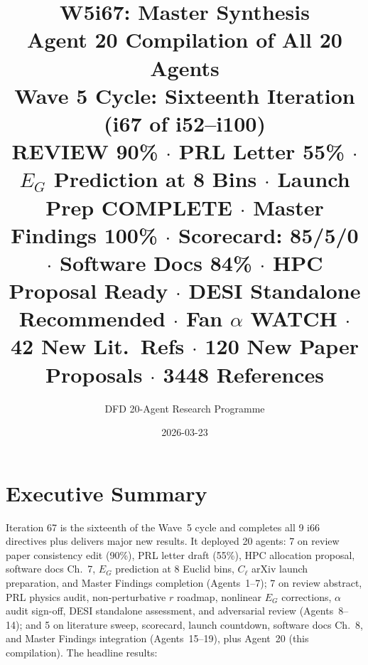 \documentclass[11pt,a4paper]{article}
\title{\Huge W5i67: Master Synthesis\\[12pt]
\Large Agent 20 Compilation of All 20 Agents\\[6pt]
\large Wave 5 Cycle: Sixteenth Iteration (i67 of i52--i100)\\[6pt]
\normalsize \textbf{REVIEW 90\%} $\cdot$ PRL Letter 55\% $\cdot$ $E_G$ Prediction at 8 Bins $\cdot$ Launch Prep COMPLETE $\cdot$ Master Findings 100\% $\cdot$ Scorecard: 85/5/0 $\cdot$ Software Docs 84\% $\cdot$ HPC Proposal Ready $\cdot$ DESI Standalone Recommended $\cdot$ Fan $\alpha$ WATCH $\cdot$ 42 New Lit.\ Refs $\cdot$ 120 New Paper Proposals $\cdot$ 3448 References}
\author{DFD 20-Agent Research Programme}
\date{2026-03-23}
\begin{document}
\maketitle


\section{Executive Summary}

Iteration 67 is the sixteenth of the Wave~5 cycle and completes all 9 i66 directives plus delivers major new results. It deployed 20 agents: 7 on review paper consistency edit (90\%), PRL letter draft (55\%), HPC allocation proposal, software docs Ch.~7, $E_G$ prediction at 8 Euclid bins, $C_\ell$ arXiv launch preparation, and Master Findings completion (Agents~1--7); 7 on review abstract, PRL physics audit, non-perturbative $r$ roadmap, nonlinear $E_G$ corrections, $\alpha$ audit sign-off, DESI standalone assessment, and adversarial review (Agents~8--14); and 5 on literature sweep, scorecard, launch countdown, software docs Ch.~8, and Master Findings integration (Agents~15--19), plus Agent~20 (this compilation). The headline results:
\end{document}
